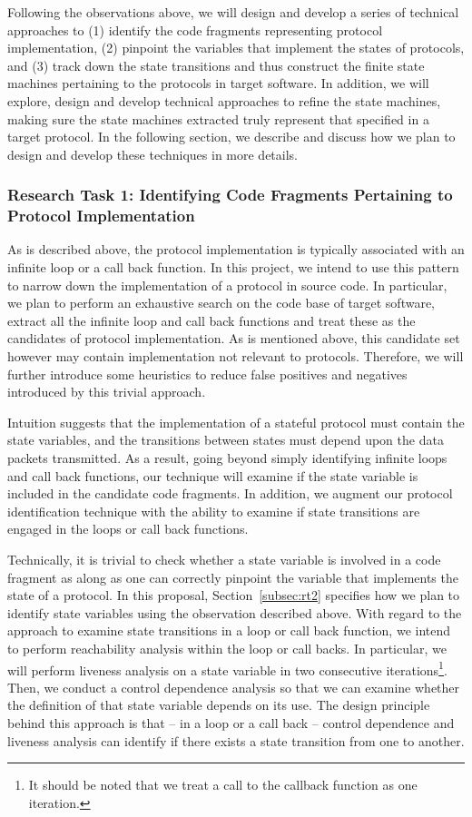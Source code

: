 Following the observations above, we will design and develop a series of
technical approaches to (1) identify the code fragments representing protocol
implementation, (2) pinpoint the variables that
implement the states of protocols, and (3) track down the state transitions and
thus construct the finite state machines pertaining to the protocols in target
software. In addition, we will explore, design and develop technical approaches
to refine the state machines, making sure the state machines extracted truly
represent that specified in a target protocol. In the following section, we
describe and discuss how we plan to design and develop these techniques in more
details.

\subsubsection{Research Task 1: Identifying Code Fragments Pertaining to
Protocol Implementation}
\label{subsec:rt1}

As is described above, the protocol implementation is typically associated with
an infinite loop or a call back function. In this project, we intend to use this
pattern to narrow down the implementation of a protocol in source code. In
particular, we plan to perform an exhaustive search on the code base of target
software, extract all the infinite loop and call back functions and treat these
as the candidates of protocol implementation. As is mentioned above, this
candidate set however may contain implementation not relevant to protocols.
Therefore, we will further introduce some heuristics to reduce false positives
and negatives introduced by this trivial approach.

Intuition suggests that the implementation of a stateful protocol must contain
the state variables, and the transitions between states must depend upon the
data packets transmitted. As a result, going beyond simply identifying infinite
loops and call back functions, our technique will examine if the state variable
is included in the candidate code fragments. In addition, we augment our
protocol identification technique with the ability to examine if state
transitions are engaged in the loops or call back functions.

Technically, it is trivial to check whether a state variable is involved in a
code fragment as along as one can correctly pinpoint the variable that
implements the state of a protocol. In this proposal, Section~\ref{subsec:rt2}
specifies how we plan to identify state variables using the observation
described above. With regard to the approach to examine state transitions in a
loop or call back function, we intend to perform reachability analysis within
the loop or call backs. In particular, we will perform liveness analysis on a
state variable in two consecutive iterations\footnote{It should be noted that we
treat a call to the callback function as one iteration.}. Then, we conduct a
control dependence analysis so that we can examine whether the definition 
of that state variable
depends on its use. The design principle behind this approach is that --
in a loop or a call back -- 
control dependence and liveness analysis can identify if there
exists a state transition from one to another.

